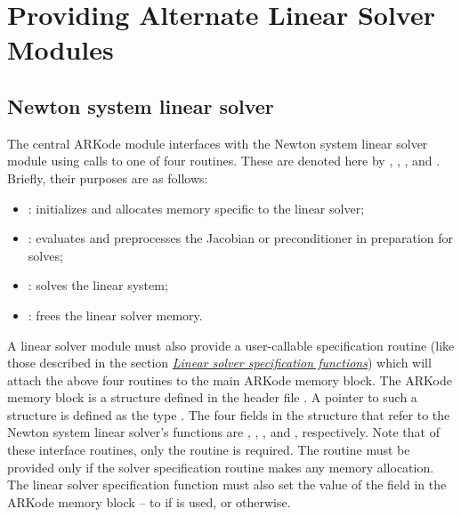 \documentclass[letterpaper,10pt,english]{sphinxmanual}
\begin{document}
\section{Providing Alternate Linear Solver Modules}
\label{linear_solvers/custom:providing-alternate-linear-solver-modules}\label{linear_solvers/custom::doc}\label{linear_solvers/custom:linearsolvers-custom}

\subsection{Newton system linear solver}
\label{linear_solvers/custom:newton-system-linear-solver}
The central ARKode module interfaces with the Newton system linear
solver module using calls to one of four routines. These are denoted
here by {\hyperref[linear_solvers/custom:linit]{}}, {\hyperref[linear_solvers/custom:lsetup]{}}, {\hyperref[linear_solvers/custom:lsolve]{}}, and
{\hyperref[linear_solvers/custom:lfree]{}}. Briefly, their purposes are as follows:
\begin{itemize}
\item {} 
{\hyperref[linear_solvers/custom:linit]{}}: initializes and allocates memory specific to the
linear solver;

\item {} 
{\hyperref[linear_solvers/custom:lsetup]{}}: evaluates and preprocesses the Jacobian or
preconditioner in preparation for solves;

\item {} 
{\hyperref[linear_solvers/custom:lsolve]{}}: solves the linear system;

\item {} 
{\hyperref[linear_solvers/custom:lfree]{}}: frees the linear solver memory.

\end{itemize}

A linear solver module must also provide a user-callable specification
routine (like those described in the section
{\hyperref[c_interface/User_callable:cinterface-linearsolvers]{\emph{Linear solver specification functions}}}) which will attach the above four
routines to the main ARKode memory block. The ARKode memory block is a
structure defined in the header file . A pointer to
such a structure is defined as the type . The four
fields in the  structure that refer to the Newton system
linear solver's functions are , ,
, and , respectively.  Note that of these
interface routines, only the {\hyperref[linear_solvers/custom:lsolve]{}} routine is
required. The {\hyperref[linear_solvers/custom:lfree]{}} routine must be provided only if the
solver specification routine makes any memory allocation.  The linear
solver specification function must also set the value of the field
 in the ARKode memory block -- to  if
{\hyperref[linear_solvers/custom:lsetup]{}} is used, or  otherwise.
\end{document}
